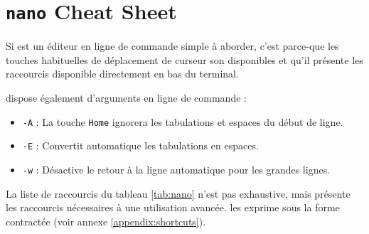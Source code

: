 \section{\texttt{nano} Cheat Sheet} \label{appendix:nano} 
\vspace{-7mm}
Si  est un éditeur en ligne de commande simple à aborder, c'est parce-que les touches habituelles de déplacement de curseur son disponibles et qu'il présente les raccourcis disponible directement en bas du terminal.

 dispose également d'arguments en ligne de commande :
\begin{itemize}
    \item \texttt{-A} : La touche \texttt{Home} ignorera les tabulations et espaces du début de ligne.
    \item \texttt{-E} : Convertit automatique les tabulations en espaces.
    \item \texttt{-w} : Désactive le retour à la ligne automatique pour les grandes lignes.
\end{itemize}
\vspace{2mm}
La liste de raccourcis du tableau \ref{tab:nano} n'est pas exhaustive, mais présente les raccourcis nécessaires à une utilisation avancée.  les exprime sous la forme contractée (voir annexe \ref{appendix:shortcuts}).

